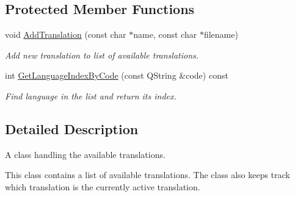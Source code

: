 \subsection*{Protected Member Functions}
\begin{DoxyCompactItemize}
\item 
void \hyperlink{class_translation_handler_a71ea7a82d9785dac510a551cb8614fe8}{Add\-Translation} (const char $\ast$name, const char $\ast$filename)
\begin{DoxyCompactList}\small\item\em Add new translation to list of available translations. \end{DoxyCompactList}\item 
int \hyperlink{class_translation_handler_a12ebba07830436ff35c883f228c537f4}{Get\-Language\-Index\-By\-Code} (const Q\-String \&code) const 
\begin{DoxyCompactList}\small\item\em Find language in the list and return its index. \end{DoxyCompactList}\end{DoxyCompactItemize}


\subsection{Detailed Description}
A class handling the available translations. 

This class contains a list of available translations. The class also keeps track which translation is the currently active translation. 

